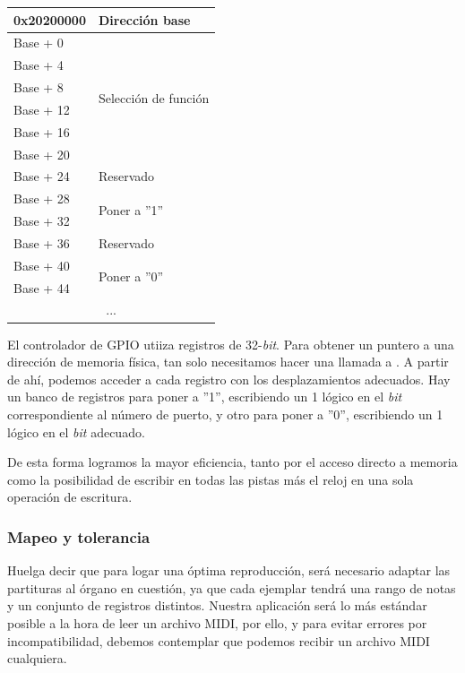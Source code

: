 \smallskip

\begin{center}
	\begin{tabular}{|l|l|}
		\hline 0x20200000 & Dirección base \\
		\hline
		\hline Base + 0 & \multirow{6}{*}{Selección de función} \\
		\cline{1-1} Base + 4 & \\
		\cline{1-1} Base + 8 & \\
		\cline{1-1} Base + 12 & \\
		\cline{1-1} Base + 16 & \\
		\cline{1-1} Base + 20 & \\
		\hline Base + 24 & Reservado \\
		\hline Base + 28 & \multirow{2}{*}{Poner a ''1''} \\
		\cline{1-1} Base + 32 & \\
		\hline Base + 36 & Reservado \\
		\hline Base + 40 & \multirow{2}{*}{Poner a ''0''} \\
		\cline{1-1} Base + 44 & \\
		\hline \multicolumn{2}{|c|}{...} \\
		\hline 
	\end{tabular}
	\smallskip
\end{center}

\smallskip

El controlador de \acrshort{GPIO} utiiza registros de 32-\textit{bit}. Para obtener un puntero a una dirección de memoria física, tan solo necesitamos hacer una llamada a  \cite{soii}. A partir de ahí, podemos acceder a cada registro con los desplazamientos adecuados. Hay un banco de registros para poner a ''1'', escribiendo un 1 lógico en el \textit{bit} correspondiente al número de puerto, y otro para poner a ''0'', escribiendo un 1 lógico en el \textit{bit} adecuado.

De esta forma logramos la mayor eficiencia, tanto por el acceso directo a memoria como la posibilidad de escribir en todas las pistas más el reloj en una sola operación de escritura.

\subsubsection{Mapeo y tolerancia}

Huelga decir que para logar una óptima reproducción, será necesario adaptar las partituras al órgano en cuestión, ya que cada ejemplar tendrá una rango de notas y un conjunto de registros distintos. Nuestra aplicación será lo más estándar posible a la hora de leer un archivo \acrshort{MIDI}, por ello, y para evitar errores por incompatibilidad, debemos contemplar que podemos recibir un archivo \acrshort{MIDI} cualquiera.

